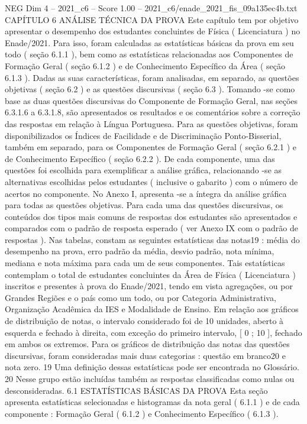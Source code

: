 \begin{textsample}{NEG Dim 4 – 2021\_c6 – Score 1.00 – 2021\_c6/enade\_2021\_fis\_09a135ec4b.txt}  \label{ex:f4_neg_291}
CAPÍTULO 6 ANÁLISE TÉCNICA DA PROVA Este capítulo tem por objetivo apresentar o desempenho dos estudantes concluintes de Física ( Licenciatura ) no Enade/2021.
Para isso, foram calculadas as estatísticas básicas da prova em seu todo ( seção 6.1.1 ), bem como as estatísticas relacionadas aos Componentes de Formação Geral ( seção 6.1.2 ) e de Conhecimento Específico da Área ( seção 6.1.3 ).
Dadas as suas características, foram analisadas, em separado, as questões objetivas ( seção 6.2 ) e as questões discursivas ( seção 6.3 ).
Tomando -se como base as duas questões discursivas do Componente de Formação Geral, nas seções 6.3.1.6 a 6.3.1.8, são apresentados os resultados e os comentários sobre a correção das respostas em relação à Língua Portuguesa.
Para as questões objetivas, foram disponibilizados os Índices de Facilidade e de Discriminação Ponto-Bisserial, também em separado, para os Componentes de Formação Geral ( seção 6.2.1 ) e de Conhecimento Específico ( seção 6.2.2 ).
De cada componente, uma das questões foi escolhida para exemplificar a análise gráfica, relacionando -se as alternativas escolhidas pelos estudantes ( inclusive o gabarito ) com o número de acertos no componente.
No Anexo I, apresenta -se a íntegra da análise gráfica para todas as questões objetivas.
Para cada uma das questões discursivas, os conteúdos dos tipos mais comuns de respostas dos estudantes são apresentados e comparados com o padrão de resposta esperado ( ver Anexo IX com o padrão de respostas ).
Nas tabelas, constam as seguintes estatísticas das notas19 : média do desempenho na prova, erro padrão da média, desvio padrão, nota mínima, mediana e nota máxima para cada um de seus componentes.
Tais estatísticas contemplam o total de estudantes concluintes da Área de Física ( Licenciatura ) inscritos e presentes à prova do Enade/2021, tendo em vista agregações, ou por Grandes Regiões e o país como um todo, ou por Categoria Administrativa, Organização Acadêmica da IES e Modalidade de Ensino.
Em relação aos gráficos de distribuição de notas, o intervalo considerado foi de 10 unidades, aberto à esquerda e fechado à direita, com exceção do primeiro intervalo, [ 0 ; 10 ], fechado em ambos os extremos.
Para os gráficos de distribuição das notas das questões discursivas, foram consideradas mais duas categorias : questão em branco20 e nota zero. 19 Uma definição dessas estatísticas pode ser encontrada no Glossário. 20 Nesse grupo estão incluídas também as respostas classificadas como nulas ou desconsideradas. 6.1 ESTATÍSTICAS BÁSICAS DA PROVA Esta seção apresenta estatísticas selecionadas e histogramas da nota geral ( 6.1.1 ) e de cada componente : Formação Geral ( 6.1.2 ) e Conhecimento Específico ( 6.1.3 ).

\end{textsample}

